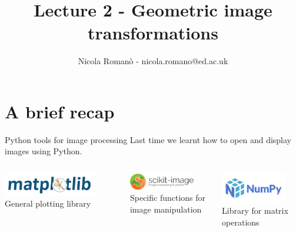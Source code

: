 \documentclass[9pt, aspectratio=169]{beamer}
\author{Nicola Roman\`o - nicola.romano@ed.ac.uk}
\title{Lecture 2 - Geometric image transformations}
\date{}
\begin{document}

\begin{frame}
    \titlepage
\end{frame}

\section{A brief recap}

\begin{frame}
    {Python tools for image processing}
    \centering
    Last time we learnt how to open and display images using Python.

    \vspace{3em}

    \begin{columns}
        \begin{column}{0.3\textwidth}
            \includegraphics[width=0.8\textwidth]{matplotlib_logo.png}
            General plotting library
        \end{column}
        \begin{column}{0.3\textwidth}
            \includegraphics[width=0.8\textwidth]{skimage_logo.png}
            Specific functions for image manipulation
        \end{column}
        \begin{column}{0.3\textwidth}
            \includegraphics[width=0.8\textwidth]{numpylogo.png}
            Library for matrix operations
        \end{column}
    \end{columns}
\end{frame}
\end{document}
